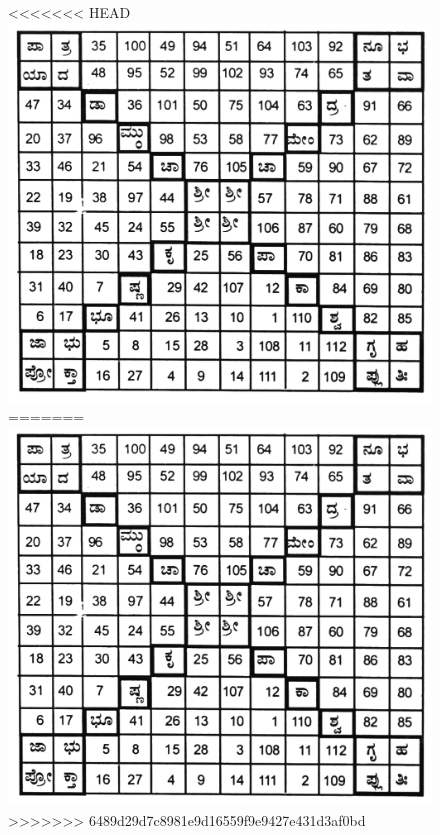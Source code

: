 \begin{figure}[H]
<<<<<<< HEAD
\includegraphics{src/figures/chap6/fig6-12.jpg}
=======
\includegraphics[scale=0.85]{src/figures/chap6/fig6.12.jpg}
>>>>>>> 6489d29d7c8981e9d16559f9e9427e431d3af0bd
\end{figure}

